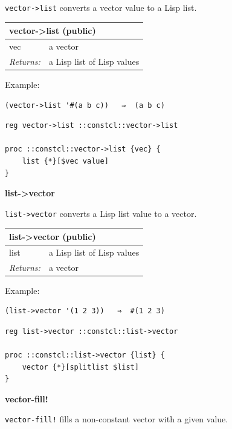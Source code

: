\documentclass[twoside,9pt]{report}
\begin{document}
\texttt{vector->list} converts a vector value to a Lisp list.

\begin{tabular}{ |l l| }
\hline
\multicolumn{2}{|l|}{vector->list (public)} \\
\hline
vec & a vector \\
\textit{Returns:} & a Lisp list of Lisp values \\
\hline
\end{tabular}


Example:

\noindent\makebox[\linewidth]{\rule{\linewidth}{0.4pt}}
\begin{lstlisting}
(vector->list '#(a b c))   ⇒  (a b c)
\end{lstlisting}
\noindent\makebox[\linewidth]{\rule{\linewidth}{0.4pt}}
\noindent\makebox[\linewidth]{\rule{\linewidth}{0.4pt}}
\begin{lstlisting}
reg vector->list ::constcl::vector->list
 
proc ::constcl::vector->list {vec} {
    list {*}[$vec value]
}
\end{lstlisting}
\noindent\makebox[\linewidth]{\rule{\linewidth}{0.4pt}}

\textbf{list->vector}


\texttt{list->vector} converts a Lisp list value to a vector.

\begin{tabular}{ |l l| }
\hline
\multicolumn{2}{|l|}{list->vector (public)} \\
\hline
list & a Lisp list of Lisp values \\
\textit{Returns:} & a vector \\
\hline
\end{tabular}


Example:

\noindent\makebox[\linewidth]{\rule{\linewidth}{0.4pt}}
\begin{lstlisting}
(list->vector '(1 2 3))   ⇒  #(1 2 3)
\end{lstlisting}
\noindent\makebox[\linewidth]{\rule{\linewidth}{0.4pt}}
\noindent\makebox[\linewidth]{\rule{\linewidth}{0.4pt}}
\begin{lstlisting}
reg list->vector ::constcl::list->vector
 
proc ::constcl::list->vector {list} {
    vector {*}[splitlist $list]
}
\end{lstlisting}
\noindent\makebox[\linewidth]{\rule{\linewidth}{0.4pt}}

\textbf{vector-fill!}


\texttt{vector-fill!} fills a non-constant vector with a given value.
\end{document}
